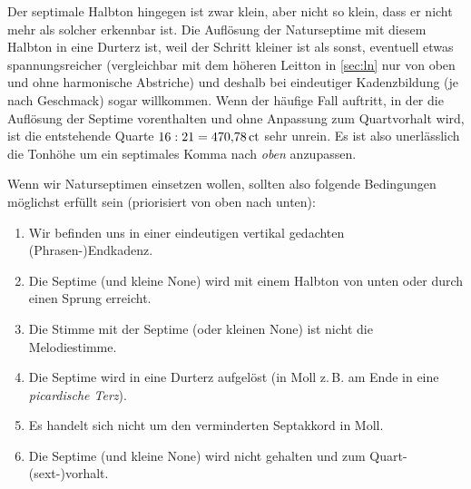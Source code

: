 Der septimale Halbton hingegen ist zwar klein, aber nicht so klein, dass er
nicht mehr als solcher erkennbar ist. Die Auflösung der Naturseptime mit diesem
Halbton in eine Durterz ist, weil der Schritt kleiner ist als sonst, eventuell
etwas spannungsreicher (vergleichbar mit dem höheren Leitton in \cref{sec:ln}
nur von oben und ohne harmonische Abstriche) und deshalb bei eindeutiger
Kadenzbildung (je nach Geschmack) sogar willkommen. Wenn der häufige Fall
auftritt, in der die Auflösung der Septime vorenthalten und ohne Anpassung zum
Quartvorhalt wird, ist die entstehende Quarte $16:21 = 470{,}78\,\text{ct}$ sehr unrein.
Es ist also unerlässlich die Tonhöhe um ein septimales Komma nach \emph{oben}
anzupassen.

Wenn wir Naturseptimen einsetzen wollen, sollten also folgende Bedingungen
möglichst erfüllt sein (priorisiert von oben nach unten):

\begin{enumerate}
  \item Wir befinden uns in einer eindeutigen vertikal gedachten
  (Phrasen-)Endkadenz.
  \item Die Septime (und kleine None) wird mit einem Halbton von unten oder
  durch einen Sprung erreicht.
  \item Die Stimme mit der Septime (oder kleinen None) ist nicht die
  Melodiestimme.
  \item Die Septime wird in eine Durterz aufgelöst (in Moll z.\,B. am Ende in
  eine \emph{picardische Terz}).
  \item Es handelt sich nicht um den verminderten Septakkord in Moll.
  \item Die Septime (und kleine None) wird nicht gehalten und zum
  Quart-(sext-)vorhalt.
\end{enumerate}

